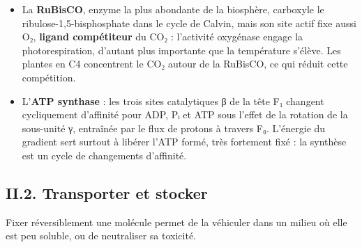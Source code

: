 \documentclass[11pt,a4paper]{article}
\providecommand{\tightlist}{\setlength{\itemsep}{0pt}\setlength{\parskip}{0pt}}
\begin{document}
\begin{itemize}
\tightlist
\item
  La \textbf{RuBisCO}, enzyme la plus abondante de la biosphère, carboxyle le ribulose-\allowbreak{}1,5-\allowbreak{}bisphosphate dans le cycle de Calvin, mais son site actif fixe aussi O₂, \textbf{ligand compétiteur} du CO₂ : l'activité oxygénase engage la photorespiration, d'autant plus importante que la température s'élève. Les plantes en C4 concentrent le CO₂ autour de la RuBisCO, ce qui réduit cette compétition.
\item
  L'\textbf{ATP synthase} : les trois sites catalytiques β de la tête F₁ changent cycliquement d'affinité pour ADP, Pᵢ et ATP sous l'effet de la rotation de la sous-unité γ, entraînée par le flux de protons à travers F₀. L'énergie du gradient sert surtout à libérer l'ATP formé, très fortement fixé : la synthèse est un cycle de changements d'affinité.
\end{itemize}

\hypertarget{ii.2.-transporter-et-stocker}{%
\subsection{II.2. Transporter et stocker}\label{ii.2.-transporter-et-stocker}}

Fixer réversiblement une molécule permet de la véhiculer dans un milieu où elle est peu soluble, ou de neutraliser sa toxicité.
\end{document}
